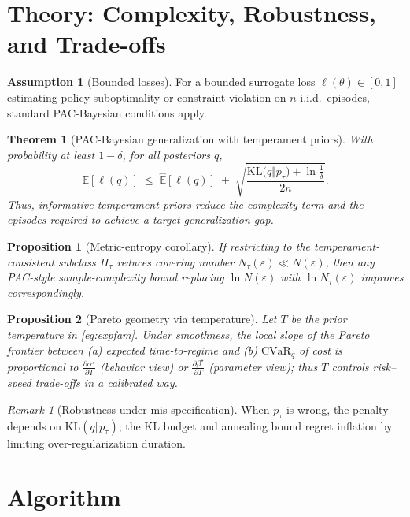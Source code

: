 \documentclass[10pt]{article}
\theoremstyle{plain}
\newtheorem{theorem}{Theorem}
\newtheorem{proposition}{Proposition}
\theoremstyle{definition}
\newtheorem{assumption}{Assumption}
\theoremstyle{remark}
\newtheorem{remark}{Remark}
\newcommand{\E}{\mathbb{E}}
\newcommand{\1}{\mathds{1}}
\newcommand{\KL}{\mathrm{KL}}
\newcommand{\cvar}{\mathrm{CVaR}}
\begin{document}
\section{Theory: Complexity, Robustness, and Trade-offs}
\label{sec:theory}

\begin{assumption}[Bounded losses]
For a bounded surrogate loss $\ell(\theta)\in[0,1]$ estimating policy suboptimality or constraint violation on $n$ i.i.d.\ episodes, standard PAC-Bayesian conditions apply.
\end{assumption}

\begin{theorem}[PAC-Bayesian generalization with temperament priors]
\label{thm:pacbayes}
With probability at least $1-\delta$, for all posteriors $q$,
\[
\E[\ell(q)] \;\le\; \hat{\E}[\ell(q)] \;+\;
\sqrt{\frac{\KL\!\big(q\Vert p_\tau\big) + \ln \tfrac{1}{\delta}}{2n}}.
\]
Thus, informative temperament priors reduce the complexity term and the episodes required to achieve a target generalization gap.
\end{theorem}

\begin{proposition}[Metric-entropy corollary]
If restricting to the temperament-consistent subclass $\Pi_\tau$ reduces covering number $N_\tau(\varepsilon)\ll N(\varepsilon)$, then any PAC-style sample-complexity bound replacing $\ln N(\varepsilon)$ with $\ln N_\tau(\varepsilon)$ improves correspondingly.
\end{proposition}

\begin{proposition}[Pareto geometry via temperature]
\label{prop:pareto}
Let $T$ be the prior temperature in \eqref{eq:expfam}. Under smoothness, the local slope of the Pareto frontier between (a) expected time-to-regime and (b) $\cvar_q$ of cost is proportional to $\frac{\partial \alpha^\star}{\partial T}$ (behavior view) or $\frac{\partial \beta^\star}{\partial T}$ (parameter view); thus $T$ controls risk--speed trade-offs in a calibrated way.
\end{proposition}

\begin{remark}[Robustness under mis-specification]
When $p_\tau$ is wrong, the penalty depends on $\KL(q\Vert p_\tau)$; the KL budget and annealing bound regret inflation by limiting over-regularization duration.
\end{remark}

\section{Algorithm}
\label{sec:algorithm}
\end{document}
